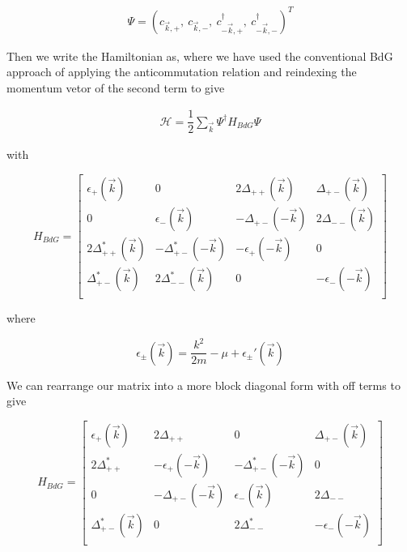 \begin{align}
  \Psi = (c_{\vec{k},+},\ c_{\vec{k},-},\ c_{-\vec{k},+}^{\dagger},\ c_{-\vec{k},-}^{\dagger} )^T
\end{align}

Then we write the Hamiltonian as, where we have used the conventional BdG approach of applying the anticommutation relation and reindexing the momentum vetor of the second term to give

\begin{align}
  \mathcal{H} = \dfrac{1}{2}\sum\limits_{\vec{k}} \Psi^{\dagger}H_{BdG}\Psi
\end{align}

with

\begin{equation}
  H_{BdG} =
  \begin{bmatrix}
    \epsilon_+(\vec{k}) & 0 & 2\Delta_{++}(\vec{k}) & \Delta_{+-}(\vec{k}) \\
    0 & \epsilon_-(\vec{k}) & -\Delta_{+-}(-\vec{k}) & 2\Delta_{--}(\vec{k}) \\
    2\Delta_{++}^*(\vec{k}) & -\Delta_{+-}^*(-\vec{k}) & -\epsilon_+(-\vec{k}) & 0 \\
    \Delta_{+-}^*(\vec{k}) & 2\Delta_{--}^*(\vec{k}) & 0 & -\epsilon_-(-\vec{k}) \\
  \end{bmatrix}
\end{equation}

where

\begin{equation}
  \epsilon_{\pm}(\vec{k}) = \dfrac{k^2}{2m} - \mu + \epsilon_{\pm}'(\vec{k})
\end{equation}

We can rearrange our matrix into a more block diagonal form with off terms to give

\begin{equation}
  H_{BdG} =
  \begin{bmatrix}
    \epsilon_+(\vec{k}) & 2\Delta_{++} & 0 & \Delta_{+-}(\vec{k}) \\
    2\Delta_{++}^* & -\epsilon_+(-\vec{k}) & -\Delta_{+-}^*(-\vec{k}) & 0 \\
    0 & -\Delta_{+-}(-\vec{k}) & \epsilon_-(\vec{k}) & 2\Delta_{--} \\
    \Delta_{+-}^*(\vec{k}) & 0 & 2\Delta_{--}^* & -\epsilon_-(-\vec{k}) \\
  \end{bmatrix}
\end{equation}

